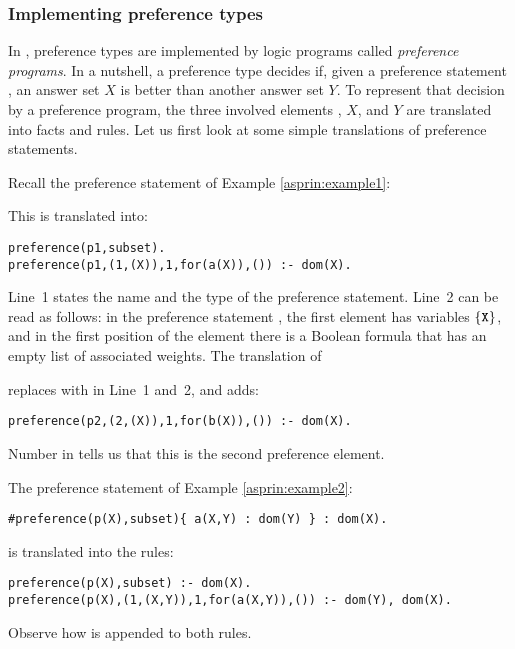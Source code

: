 \subsubsection{Implementing preference types}

In \asprin, preference types are implemented by logic programs called \emph{preference programs}.
In a nutshell, a preference type decides if, 
given a preference statement , 
an answer set $X$ is better than another answer set $Y$.
To represent that decision by a preference program, 
the three involved elements , $X$, and $Y$ are translated into facts and rules.
Let us first look at some simple translations of preference statements.
\begin{example}
\label{asprin:example1translated}
Recall the preference statement  of Example \ref{asprin:example1}:

This is translated into: %
\begin{lstlisting}
preference(p1,subset).
preference(p1,(1,(X)),1,for(a(X)),()) :- dom(X).
\end{lstlisting}
Line~1 states the name and the type of the preference statement.
Line~2 can be read as follows:
in the preference statement , the first element has variables $\{\texttt{X}\}$,  
and in the first position of the element there is a Boolean formula  that has an empty list of associated weights.
The translation of 

replaces  with  in Line~1 and~2, and adds:
\begin{lstlisting}[numbers=none]
preference(p2,(2,(X)),1,for(b(X)),()) :- dom(X).
\end{lstlisting}
Number  in  tells us that this is the second preference element. 
\end{example}

\begin{example}
The preference statement of Example \ref{asprin:example2}: 
\begin{lstlisting}[numbers=none]
#preference(p(X),subset){ a(X,Y) : dom(Y) } : dom(X).
\end{lstlisting}
is translated into the rules:
\begin{lstlisting}[numbers=none]
preference(p(X),subset) :- dom(X).
preference(p(X),(1,(X,Y)),1,for(a(X,Y)),()) :- dom(Y), dom(X).
\end{lstlisting}
Observe how  is appended to both rules. 
\end{example}

